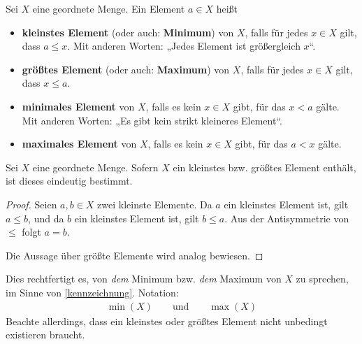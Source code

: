 \begin{defin} \label{def:kleinstes}      
Sei $X$ eine geordnete Menge. Ein Element $a\in X$ heißt
    \begin{itemize}
        \item \textbf{kleinstes Element} (oder auch: \textbf{Minimum}) von $X$, falls für jedes $x\in X$ gilt, dass $a\le x$. Mit anderen Worten: „Jedes Element ist größergleich $x$“.
        \item \textbf{größtes Element} (oder auch: \textbf{Maximum}) von $X$, falls für jedes $x\in X$ gilt, dass $x\le a$.
        \item \textbf{minimales Element} von $X$, falls es kein $x\in X$ gibt, für das $x<a$ gälte. Mit anderen Worten: „Es gibt kein strikt kleineres Element“.
        \item \textbf{maximales Element} von $X$, falls es kein $x\in X$ gibt, für das $a<x$ gälte.
    \end{itemize}
\end{defin}


\begin{satz} \label{kleinsteseind}
    Sei $X$ eine geordnete Menge. Sofern $X$ ein kleinstes bzw. größtes Element enthält, ist dieses eindeutig bestimmt.
\end{satz}
\begin{proof}
    Seien $a,b\in X$ zwei kleinste Elemente. Da $a$ ein kleinstes Element ist, gilt $a\le b$, und da $b$ ein kleinstes Element ist, gilt $b\le a$. Aus der Antisymmetrie von $\le$ folgt $a=b$.

    Die Aussage über größte Elemente wird analog bewiesen.
\end{proof}


\begin{nota}
    Dies rechtfertigt es, von \emph{dem} Minimum bzw. \emph{dem} Maximum von $X$ zu sprechen, im Sinne von \cref{kennzeichnung}. Notation:
    \begin{align*}
        \min(X) \qquad\text{und}\qquad \max(X)
    \end{align*}
    Beachte allerdings, dass ein kleinstes oder größtes Element nicht unbedingt existieren braucht.
\end{nota}


